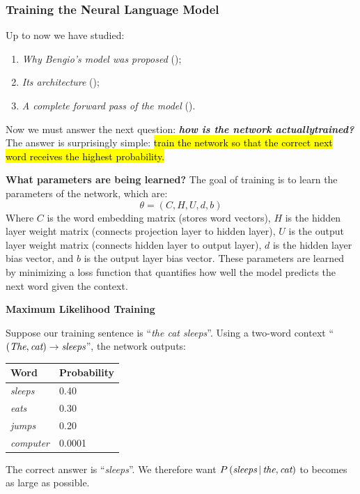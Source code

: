 \subsubsection{Training the Neural Language Model}\label{sec:training-the-neural-language-model}

Up to now we have studied:
\begin{enumerate}
    \item \emph{Why Bengio's model was proposed} ();
    \item \emph{Its architecture} ();
    \item \emph{A complete forward pass of the model} ().
\end{enumerate}
Now we must answer the next question: \textbf{\emph{how is the network actually\break trained?}} The answer is surprisingly simple: \hl{train the network so that the correct next word receives the highest probability.}

\highspace
\textcolor{Green3}{ \textbf{What parameters are being learned?}} The goal of training is to learn the parameters of the network, which are:
\begin{equation*}
    \theta = \left(C, H, U, d, b\right)
\end{equation*}
Where $C$ is the word embedding matrix (stores word vectors), $H$ is the hidden layer weight matrix (connects projection layer to hidden layer), $U$ is the output layer weight matrix (connects hidden layer to output layer), $d$ is the hidden layer bias vector, and $b$ is the output layer bias vector. These parameters are learned by minimizing a loss function that quantifies how well the model predicts the next word given the context.

\highspace
\begin{flushleft}
    \textcolor{Green3}{ \textbf{Maximum Likelihood Training}}
\end{flushleft}
Suppose our training sentence is ``\emph{the cat sleeps}''. Using a two-word context ``$\left(\emph{The}, \emph{cat}\right) \to \emph{sleeps}$'', the network outputs:
\begin{center}
    \begin{tabular}{@{} l l @{}}
        \toprule
        \textbf{Word} & \textbf{Probability} \\
        \midrule
        \emph{sleeps} & 0.40 \\
        \emph{eats} & 0.30 \\
        \emph{jumps} & 0.20 \\
        \emph{computer} & 0.0001 \\
        \bottomrule
    \end{tabular}
\end{center}
\noindent
The correct answer is ``\emph{sleeps}''. We therefore want $P\left(\emph{sleeps} \, | \, \emph{the}, \emph{cat}\right)$ to becomes as large as possible.

